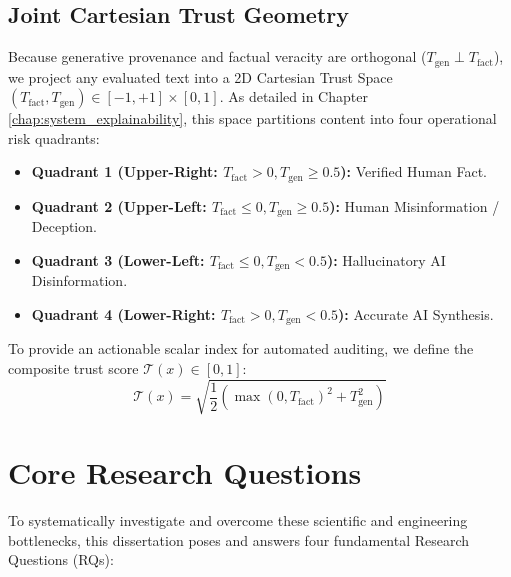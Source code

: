 \subsection{Joint Cartesian Trust Geometry}
Because generative provenance and factual veracity are orthogonal ($T_{\text{gen}} \perp T_{\text{fact}}$), we project any evaluated text into a 2D Cartesian Trust Space $(T_{\text{fact}}, T_{\text{gen}}) \in [-1, +1] \times [0, 1]$. As detailed in Chapter \ref{chap:system_explainability}, this space partitions content into four operational risk quadrants:
\begin{itemize}
    \item \textbf{Quadrant 1 (Upper-Right: $T_{\text{fact}} > 0, T_{\text{gen}} \ge 0.5$):} Verified Human Fact.
    \item \textbf{Quadrant 2 (Upper-Left: $T_{\text{fact}} \le 0, T_{\text{gen}} \ge 0.5$):} Human Misinformation / Deception.
    \item \textbf{Quadrant 3 (Lower-Left: $T_{\text{fact}} \le 0, T_{\text{gen}} < 0.5$):} Hallucinatory AI Disinformation.
    \item \textbf{Quadrant 4 (Lower-Right: $T_{\text{fact}} > 0, T_{\text{gen}} < 0.5$):} Accurate AI Synthesis.
\end{itemize}
To provide an actionable scalar index for automated auditing, we define the composite trust score $\mathcal{T}(x) \in [0, 1]$:
\begin{equation}
\label{eq:intro_composite_trust}
\mathcal{T}(x) = \sqrt{\frac{1}{2}\left(\max(0, T_{\text{fact}})^2 + T_{\text{gen}}^2\right)}
\end{equation}

\section{Core Research Questions}
\label{sec:intro_rqs}

To systematically investigate and overcome these scientific and engineering bottlenecks, this dissertation poses and answers four fundamental Research Questions (RQs):

